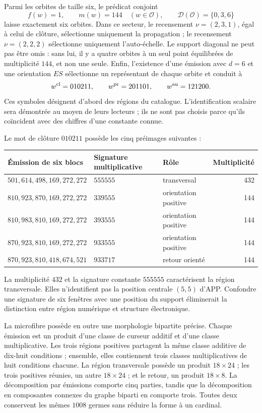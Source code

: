 Parmi les orbites de taille six, le prédicat conjoint
\[
 f(w)=1,\qquad m(w)=144\quad(w\in\mathcal O),\qquad
 \mathcal D(\mathcal O)=\{0,3,6\}
\]
laisse exactement six orbites. Dans ce secteur, le recensement \(\nu=(2,3,1)\), égal à celui de clôture, sélectionne uniquement la propagation ; le recensement \(\nu=(2,2,2)\) sélectionne uniquement l'auto-échelle. Le support diagonal ne peut pas être omis : sans lui, il y a quatre orbites à un seul point équilibrées de multiplicité \(144\), et non une seule. Enfin, l'existence d'une émission avec \(d=6\) et une orientation \(ES\) sélectionne un représentant de chaque orbite et conduit à
\begin{equation}
 w^{\rm cl}=010211,\qquad w^{\rm pr}=201101,\qquad w^{\rm au}=121200.
 \label{eq:palabras-regionales}
\end{equation}
Ces symboles désignent d'abord des régions du catalogue. L'identification scalaire sera démontrée au moyen de leurs lecteurs ; ils ne sont pas choisis parce qu'ils coïncident avec des chiffres d'une constante connue.

Le mot de clôture \(010211\) possède les cinq préimages suivantes :
\begin{center}\small
\begin{tabular}{@{}lll r@{}}\toprule
Émission de six blocs&Signature multiplicative&Rôle&Multiplicité\\\midrule
\(501,614,498,169,272,272\)&\(555555\)&transversal&432\\
\(810,923,870,169,272,272\)&\(339555\)&orientation positive&144\\
\(810,983,810,169,272,272\)&\(393555\)&orientation positive&144\\
\(870,923,810,169,272,272\)&\(933555\)&orientation positive&144\\
\(870,923,810,418,674,521\)&\(933717\)&retour orienté&144\\\bottomrule
\end{tabular}
\end{center}
La multiplicité \(432\) et la signature constante \(555555\) caractérisent la région transversale. Elles n'identifient pas la position centrale \((5,5)\) d'APP. Confondre une signature de six fenêtres avec une position du support éliminerait la distinction entre région numérique et structure électronique.

La microfibre possède en outre une morphologie bipartite précise. Chaque émission est un produit d'une classe de curseur additif et d'une classe multiplicative. Les trois régions positives partagent la même classe additive de dix-huit conditions ; ensemble, elles contiennent trois classes multiplicatives de huit conditions chacune. La région transversale possède un produit \(18\times24\) ; les trois positives réunies, un autre \(18\times24\) ; et le retour, un produit \(18\times8\). La décomposition par émissions comporte cinq parties, tandis que la décomposition en composantes connexes du graphe biparti en comporte trois. Toutes deux conservent les mêmes \(1008\) germes sans réduire la forme à un cardinal.

